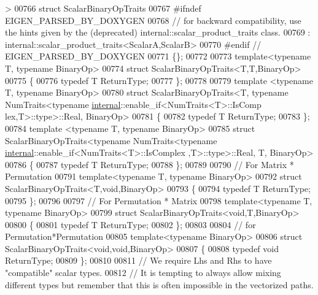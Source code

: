 \begin{DoxyCode}
{       >
00766 \textcolor{keyword}{struct }ScalarBinaryOpTraits
00767 #ifndef EIGEN\_PARSED\_BY\_DOXYGEN
00768   \textcolor{comment}{// for backward compatibility, use the hints given by the (deprecated) internal::scalar\_product\_traits
       class.}
00769   : internal::scalar\_product\_traits<ScalarA,ScalarB>
00770 \textcolor{preprocessor}{#endif // EIGEN\_PARSED\_BY\_DOXYGEN}
00771 \{\};
00772 
00773 \textcolor{keyword}{template}<\textcolor{keyword}{typename} T, \textcolor{keyword}{typename} BinaryOp>
00774 \textcolor{keyword}{struct }ScalarBinaryOpTraits<T,T,BinaryOp>
00775 \{
00776   \textcolor{keyword}{typedef} T ReturnType;
00777 \};
00778 
00779 \textcolor{keyword}{template} <\textcolor{keyword}{typename} T, \textcolor{keyword}{typename} BinaryOp>
00780 \textcolor{keyword}{struct }ScalarBinaryOpTraits<T, typename NumTraits<typename \hyperlink{namespaceinternal}{internal}::enable\_if<NumTraits<T>::IsComp
      lex,T>::type>::Real, BinaryOp>
00781 \{
00782   \textcolor{keyword}{typedef} T ReturnType;
00783 \};
00784 \textcolor{keyword}{template} <\textcolor{keyword}{typename} T, \textcolor{keyword}{typename} BinaryOp>
00785 \textcolor{keyword}{struct }ScalarBinaryOpTraits<typename NumTraits<typename \hyperlink{namespaceinternal}{internal}::enable\_if<NumTraits<T>::IsComplex
      ,T>::type>::Real, T, BinaryOp>
00786 \{
00787   \textcolor{keyword}{typedef} T ReturnType;
00788 \};
00789 
00790 \textcolor{comment}{// For Matrix * Permutation}
00791 \textcolor{keyword}{template}<\textcolor{keyword}{typename} T, \textcolor{keyword}{typename} BinaryOp>
00792 \textcolor{keyword}{struct }ScalarBinaryOpTraits<T,void,BinaryOp>
00793 \{
00794   \textcolor{keyword}{typedef} T ReturnType;
00795 \};
00796 
00797 \textcolor{comment}{// For Permutation * Matrix}
00798 \textcolor{keyword}{template}<\textcolor{keyword}{typename} T, \textcolor{keyword}{typename} BinaryOp>
00799 \textcolor{keyword}{struct }ScalarBinaryOpTraits<void,T,BinaryOp>
00800 \{
00801   \textcolor{keyword}{typedef} T ReturnType;
00802 \};
00803 
00804 \textcolor{comment}{// for Permutation*Permutation}
00805 \textcolor{keyword}{template}<\textcolor{keyword}{typename} BinaryOp>
00806 \textcolor{keyword}{struct }ScalarBinaryOpTraits<void,void,BinaryOp>
00807 \{
00808   \textcolor{keyword}{typedef} \textcolor{keywordtype}{void} ReturnType;
00809 \};
00810 
00811 \textcolor{comment}{// We require Lhs and Rhs to have "compatible" scalar types.}
00812 \textcolor{comment}{// It is tempting to always allow mixing different types but remember that this is often impossible in the
       vectorized paths.}
}
\end{DoxyCode}
